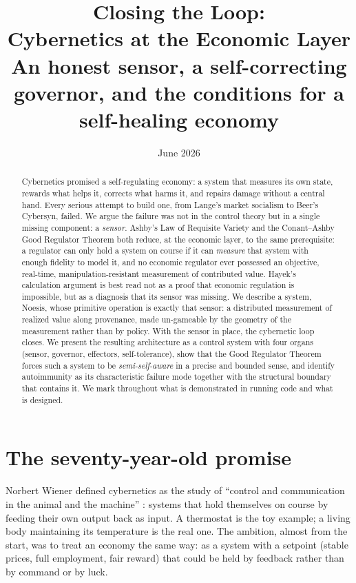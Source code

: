 \documentclass[10pt]{article}
\title{\vspace{-2em}\textbf{Closing the Loop:\\ Cybernetics at the Economic Layer}\\[0.3em]
\large An honest sensor, a self-correcting governor, and the conditions for a self-healing economy}
\date{June 2026}
\begin{document}
\maketitle
\vspace{-1.5em}

\begin{abstract}
\noindent Cybernetics promised a self-regulating economy: a system that measures its own state, rewards
what helps it, corrects what harms it, and repairs damage without a central hand. Every serious attempt
to build one, from Lange's market socialism to Beer's Cybersyn, failed. We argue the failure was not in
the control theory but in a single missing component: a \emph{sensor}. Ashby's Law of Requisite Variety
and the Conant--Ashby Good Regulator Theorem both reduce, at the economic layer, to the same
prerequisite: a regulator can only hold a system on course if it can \emph{measure} that system with
enough fidelity to model it, and no economic regulator ever possessed an objective, real-time,
manipulation-resistant measurement of contributed value. Hayek's calculation argument is best read not
as a proof that economic regulation is impossible, but as a diagnosis that its sensor was missing. We
describe a system, Noesis, whose primitive operation is exactly that sensor: a distributed measurement
of realized value along provenance, made un-gameable by the geometry of the measurement rather than by
policy. With the sensor in place, the cybernetic loop closes. We present the resulting architecture as a
control system with four organs (sensor, governor, effectors, self-tolerance), show that the Good
Regulator Theorem forces such a system to be \emph{semi-self-aware} in a precise and bounded sense, and
identify autoimmunity as its characteristic failure mode together with the structural boundary that
contains it. We mark throughout what is demonstrated in running code and what is designed.
\end{abstract}

\section{The seventy-year-old promise}

Norbert Wiener defined cybernetics as the study of ``control and communication in the animal and the
machine'' \cite{wiener1948}: systems that hold themselves on course by feeding their own output back as
input. A thermostat is the toy example; a living body maintaining its temperature is the real one. The
ambition, almost from the start, was to treat an economy the same way: as a system with a setpoint
(stable prices, full employment, fair reward) that could be held by feedback rather than by command or
by luck.
\end{document}
